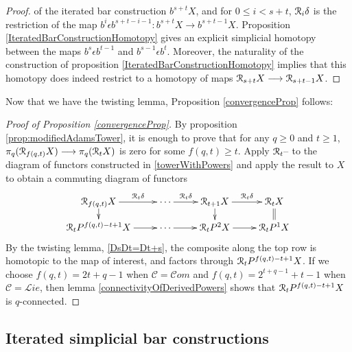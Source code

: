 \documentclass[11pt]{amsart}
\theoremstyle{plain}
\theoremstyle{definition}
\newcommand{\DASH}{\textup{--}}
\renewcommand{\to}{\longrightarrow}
\newcommand{\scrL}{\mathscr{L}}
\newcommand{\scrC}{\mathscr{C}}
\newcommand{\calR}{\mathcal{R}}
\newcommand{\calC}{\mathcal{C}}
\theoremstyle{plain}
\newcommand{\algs}{{\scrC\!\textit{om}}}
\newcommand{\liealgs}{{\scrL\!\textit{ie}}}
\newcommand{\algcat}{{\calC}}%
\newcommand{\caldup}[1]{\calR_{\smash{#1}}}
\newcommand{\barConstructionMightAbbreviate}{b}
\begin{document}
\begin{BK spec seq}
\begin{connectivity}
\begin{proof}
of the iterated bar construction $\barConstructionMightAbbreviate^{s+t}X$, and for $0\leq i<s+t$, $\caldup{i}\delta$ is the restriction of the map $\barConstructionMightAbbreviate^i\epsilon \barConstructionMightAbbreviate^{s+t-i-1}:\barConstructionMightAbbreviate^{s+t}X\to \barConstructionMightAbbreviate^{s+t-1}X$.
Proposition \ref{IteratedBarConstructionHomotopy} gives an explicit simplicial homotopy between the maps $\barConstructionMightAbbreviate^s\epsilon \barConstructionMightAbbreviate^{t-1}$ and $\barConstructionMightAbbreviate^{s-1}\epsilon \barConstructionMightAbbreviate^{t}$. Moreover, the naturality of the construction of proposition \ref{IteratedBarConstructionHomotopy} implies that this homotopy does indeed restrict to a homotopy of maps $\caldup{s+t}X\to \caldup{s+t-1}X$.
\end{proof}


Now that we have the twisting lemma, Proposition \ref{convergenceProp} follows:
\begin{proof}[Proof of Proposition \ref{convergenceProp}]
By proposition \ref{prop:modifiedAdamsTower}, it is enough to prove that for any $q\geq0$ and $t\geq1$, $\pi_q(\caldup{f(q,t)}X)\to\pi_q(\caldup{t}X)$ is zero for some $f(q,t)\geq t$.
Apply $\caldup{t}\DASH$ to the diagram of functors constructed in \ref{towerWithPowers} and apply the result to $X$ to obtain a commuting diagram of functors
\[\xymatrix@R=4mm{
\caldup{f(q,t)}X
\ar[r]^-{\caldup{t}\delta}
\ar[d]
&
\cdots \ar[r]^-{\caldup{t}\delta}
&%
\caldup{t+1}X
\ar[r]^-{\caldup{t}\delta}
\ar[d]&%
\caldup{t}X
\ar@{=}[d]
\\%
\caldup{t}P^{f(q,t)-t+1}X
\ar[r]
&%
\cdots 
\ar[r]&%
\caldup{t}P^2X
\ar[r]
&%
\caldup{t}P^1X%
}\]
By the twisting lemma, \ref{DsDt=Dt+s}, the composite along the top row is homotopic to the map of interest, and factors through $\caldup{t}P^{f(q,t)-t+1}X$. If we choose $f(q,t)=2t+q-1$ when $\algcat=\algs$ and $f(q,t)=2^{t+q-1}+t-1$ when $\algcat=\liealgs$, then lemma \ref{connectivityOfDerivedPowers} shows that $\caldup{t}P^{f(q,t)-t+1}X$  is $q$-connected.
\end{proof}

\subsection{Iterated simplicial bar constructions}\label{sec:ItSimpBar}



\end{connectivity}
\end{BK spec seq}
\end{document}
